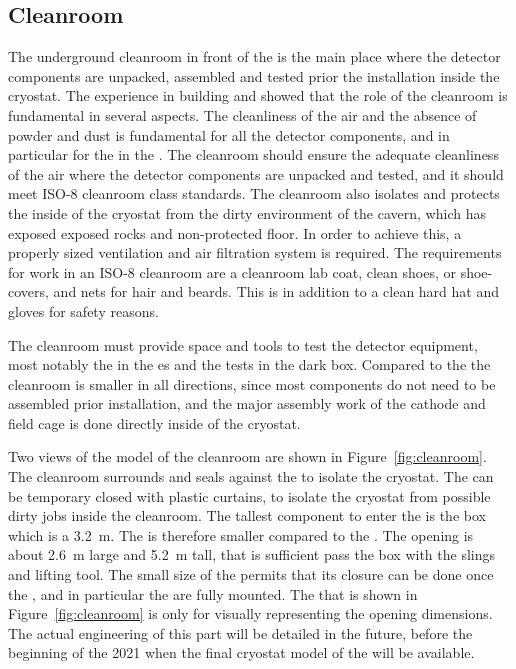 \subsection{Cleanroom}
The underground cleanroom in front of the  is the main place where the detector components are unpacked, assembled and tested prior the installation inside the cryostat.
The experience in building  and  showed that the role of the cleanroom is fundamental in several aspects.
The cleanliness of the air and the absence of powder and dust is fundamental for all the detector components, and in particular for the  in the .
The cleanroom should ensure the adequate cleanliness of the air where the detector components are unpacked and tested, and it should meet ISO-8 cleanroom class standards.
The cleanroom also isolates and protects the inside of the cryostat from the dirty environment of the cavern, which has exposed exposed rocks and non-protected floor.
In order to achieve this, a properly sized ventilation and air filtration system is required.
The requirements for work in an ISO-8 cleanroom are a cleanroom lab coat, clean shoes, or shoe-covers, and nets for hair and beards.
This is in addition to a clean hard hat and gloves for safety reasons.

The cleanroom must provide space and tools to test the detector equipment, most notably the  in the  \coldbox{}es and the  tests in the dark box.
Compared to the  the cleanroom is smaller in all  directions, since most components do not need to be assembled prior installation, and the major assembly work of the cathode and field cage is done directly inside of the cryostat.

Two views of the \threed model of the cleanroom are shown in Figure~\ref{fig:cleanroom}.
The cleanroom surrounds and seals against the  to isolate the cryostat.
The  can be temporary closed with plastic curtains, to isolate the cryostat from possible dirty jobs inside the cleanroom.
The tallest component to enter the  is the  box which is a 3.2~m.
The  is therefore smaller compared to the .
The opening is about 2.6~m large and 5.2~m tall, that is sufficient pass the  box with the slings and lifting tool.
The small size of the  permits that its closure can be done once the , and in particular the  are fully mounted.
The  that is shown in Figure~\ref{fig:cleanroom} is only for visually representing the opening dimensions.
The actual engineering of this part will be detailed in the future, before the beginning of the 2021 when the final cryostat model of the  will be available.

